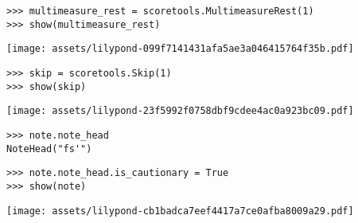 \begin{abjadbookoutput}
\begin{singlespacing}
\vspace{-0.5\baselineskip}
\begin{lstlisting}
>>> multimeasure_rest = scoretools.MultimeasureRest(1)
>>> show(multimeasure_rest)
\end{lstlisting}
\noindent\texttt{[image: assets/lilypond-099f7141431afa5ae3a046415764f35b.pdf]}
\end{singlespacing}
\end{abjadbookoutput}

\begin{comment}
<abjad>
skip = scoretools.Skip(1)
show(skip)
</abjad>
\end{comment}

\begin{abjadbookoutput}
\begin{singlespacing}
\vspace{-0.5\baselineskip}
\begin{lstlisting}
>>> skip = scoretools.Skip(1)
>>> show(skip)
\end{lstlisting}
\noindent\texttt{[image: assets/lilypond-23f5992f0758dbf9cdee4ac0a923bc09.pdf]}
\end{singlespacing}
\end{abjadbookoutput}

\begin{comment}
<abjad>
note.note_head
note.note_head.is_cautionary = True
show(note)
</abjad>
\end{comment}

\begin{abjadbookoutput}
\begin{singlespacing}
\vspace{-0.5\baselineskip}
\begin{lstlisting}
>>> note.note_head
NoteHead("fs'")
\end{lstlisting}
\begin{lstlisting}
>>> note.note_head.is_cautionary = True
>>> show(note)
\end{lstlisting}
\noindent\texttt{[image: assets/lilypond-cb1badca7eef4417a7ce0afba8009a29.pdf]}
\end{singlespacing}
\end{abjadbookoutput}

\begin{comment}
<abjad>
for note_head in chord.note_heads:
    note_head

chord.note_heads.append("a'")
show(chord)
</abjad>
\end{comment}

